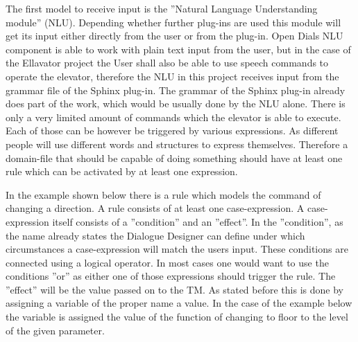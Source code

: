 The first model to receive input is the ”Natural Language Understanding module” (NLU). 
Depending whether further plug-ins are used this module will get its input either directly from the user or from the plug-in.
Open Dials NLU component is able to work with plain text input from the user, but in the case of the Ellavator project the User shall also be able to use speech commands to operate the elevator, therefore the NLU in this project receives input from the grammar file of the Sphinx plug-in.
The grammar of the Sphinx plug-in already does part of the work, which would be usually done by the NLU alone.
There is only a very limited amount of commands which the elevator is able to execute.
Each of those can be however be triggered by various expressions. As different people will use different words and structures to express themselves.
Therefore a domain-file that should be capable of doing something should have at least one rule which can be activated by at least one expression. \newline

In the example shown below there is a rule which models the command of changing a direction.
A rule consists of at least one case-expression.
A case-expression itself consists of a ”condition” and an ”effect”.
 In the ”condition”, as the name already states the Dialogue Designer can define under which circumstances a case-expression will match the users input.
These conditions are connected using a logical operator.
In most cases one would want to use the conditions ”or” as either one of those expressions should trigger the rule.
 The ”effect” will be the value passed on to the TM.
As stated before this is done by assigning a variable of the proper name a value.
In the case of the example below the variable is assigned the value of the function of changing to floor to the level of the given parameter. 
\newline


